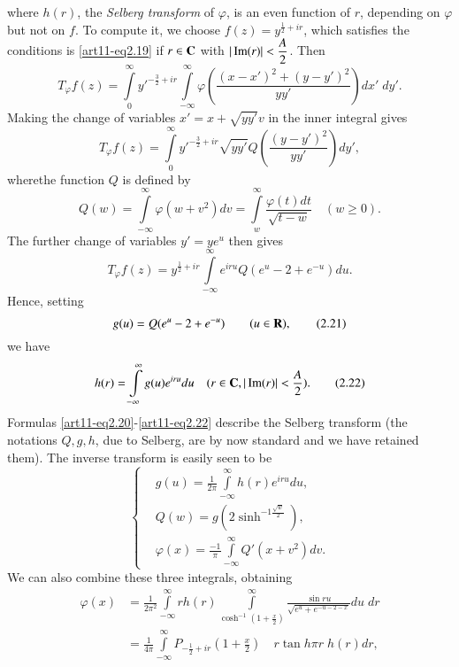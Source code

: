 where $h(r)$, the \textit{Selberg transform} of $\varphi$, is an even function of $r$, depending on $\varphi$ but not on $f$. To compute it, we choose $f(z) = y^{\frac{1}{2} + ir}$, which satisfies the conditions is \eqref{art11-eq2.19} if $r \in \mathbf{C}$ with $|\operatorname{Im} (r)| <\dfrac{A}{2}$. Then 
$$
T_\varphi f(z) = \int\limits^\infty_0 y'^{-\frac{3}{2} + ir} \int\limits^\infty_{-\infty} \varphi  \left(\frac{(x-x')^2 + (y-y')^2}{yy'} \right) dx' \; dy'. 
$$
Making the change of variables $x' = x + \sqrt{yy'} v$ in the inner integral gives 
$$
T_\varphi f(z) = \int\limits^\infty_0 y'^{-\frac{3}{2} + ir} \sqrt{yy'} Q \left(\frac{(y-y')^2}{yy'} \right) dy',
$$
where\pageoriginale the function $Q$ is defined by 
\begin{equation*}
Q(w) = \int\limits^\infty_{-\infty} \varphi (w + v^2) dv = \int\limits^\infty_{w}  \frac{\varphi (t) dt}{\sqrt{t -w}} \quad (w \geqslant 0). 
\tag{2.20}\label{art11-eq2.20}
\end{equation*}
The further change of variables $y' = ye^u$ then gives 
$$
T_\varphi f(z) = y^{\frac{1}{2} + ir} \int\limits^\infty_{-\infty} e^{ir u} Q (e^u -2 + e^{-u}) du. 
$$
Hence, setting
\begin{equation*}
g(u) = Q(e^u - 2 + e^{-u}) \qquad (u \in \mathbf{R}), \tag{2.21}\label{art11-eq2.21}
\end{equation*}
we have 
\begin{equation*}
h(r) = \int\limits^\infty_{-\infty} g (u) e^{iru} du \quad (r \in \mathbf{C}, |\operatorname{Im} (r)| < \frac{A}{2}). 
\tag{2.22}\label{art11-eq2.22}
\end{equation*}
Formulas \eqref{art11-eq2.20}-\eqref{art11-eq2.22} describe the Selberg transform (the notations $Q, g, h$, due to Selberg, are by now standard and we have retained them). The inverse transform is easily seen to be 
\begin{equation*}
\left\{
\begin{aligned}
& g (u) = \frac{1}{2 \pi} \int\limits^\infty_{-\infty} h (r) e^{ir u} du, \\
& Q (w) = g (2 \sinh^{-1\frac{\sqrt{w}}{2}}),\\
& \varphi (x) = \frac{-1}{\pi} \int\limits^\infty_{-\infty} Q' (x +
  v^2) dv.
\end{aligned}
\right.
\end{equation*}
We can also combine these three integrals, obtaining 
\begin{align*}
\varphi (x) & = \frac{1}{2 \pi^2} \int\limits^\infty_{-\infty} r h (r)
\int\limits^\infty_{\cosh^{-1} (1+\frac{x}{2})} \frac{\sin  ru
}{\sqrt{e^u+ e^{-u - 2 -x}}} du \;dr \\
& = \frac{1}{4 \pi} \int\limits^\infty_{-\infty} P_{-\frac{1}{2} + ir}
(1+ \frac{x}{2}) \quad r \tan h \pi r \; h (r) dr,  \tag{2.24} \label{art11-eq2.24}
\end{align*}
